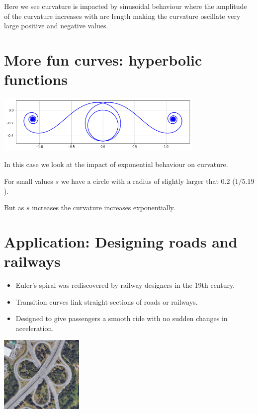 \documentclass[]{article} %
\theoremstyle{definition}
\theoremstyle{theorem}
\begin{document}
Here we see curvature is impacted by sinusoidal behaviour where the amplitude of the curvature increases with arc length making the curvature oscillate very large positive and negative values.
	
\section{More fun curves: hyperbolic functions}
\begin{tcolorbox}
	\begin{minipage}{\linewidth}
	\centering
	\includegraphics[width=100mm, scale=0.5]{sinh.png}
\end{minipage}
\end{tcolorbox}

In this case we look at the impact of exponential behaviour on curvature. 

For small values $s$ we have a circle with a radius of slightly larger that 0.2 ($1/5.19$).

But as $s$ increases the curvature increases exponentially.

\section{Application: Designing roads and railways}
\begin{tcolorbox}
	\begin{itemize}
		\item Euler's spiral was rediscovered by railway designers in the 19th century.
		\item Transition curves link straight sections of roads or railways.
		\item Designed to give passengers a smooth ride with no sudden changes in acceleration.
	\end{itemize}
	\begin{minipage}{\linewidth}
		\centering
		\includegraphics[width=40mm, scale=0.5]{cloverleaf_motorway.png}
	\end{minipage}
\end{tcolorbox}
\end{document}
